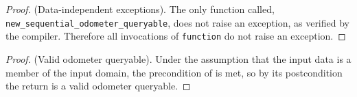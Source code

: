 \documentclass{article}
\begin{document}
\begin{proof} \textup{(Data-independent exceptions).} 
    The only function called, \texttt{new\_sequential\_odometer\_queryable},
    does not raise an exception, as verified by the compiler. 
    Therefore all invocations of \texttt{function} do not raise an exception.
\end{proof}

\begin{proof} \textup{(Valid odometer queryable).} 
    Under the assumption that the input data is a member of the input domain,
    the precondition of  is met,
    so by its postcondition the return is a valid odometer queryable.
\end{proof}
\end{document}
